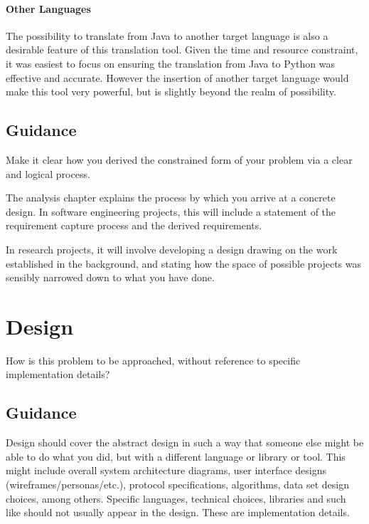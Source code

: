 \documentclass{l4proj}
\begin{document}
\subsubsection{Other Languages}
The possibility to translate from Java to another target language is also a desirable feature of this translation tool. Given the time and resource constraint, it was easiest to focus on ensuring the translation from Java to Python was effective and accurate. However the insertion of another target language would make this tool very powerful, but is slightly beyond the realm of possibility.




\section{Guidance}
Make it clear how you derived the constrained form of your problem via a clear and logical process. 

The analysis chapter explains the process by which you arrive at a concrete design. In software 
engineering projects, this will include a statement of the requirement capture process and the
derived requirements.

In research projects, it will involve developing a design drawing on
the work established in the background, and stating how the space of possible projects was
sensibly narrowed down to what you have done.

\chapter{Design}
How is this problem to be approached, without reference to specific implementation details? 
\section{Guidance}
Design should cover the abstract design in such a way that someone else might be able to do what you did, 
but with a different language or library or tool. This might include overall system architecture diagrams,
user interface designs (wireframes/personas/etc.), protocol specifications, algorithms, data set design choices,
among others. Specific languages, technical choices, libraries and such like should not usually appear in the design. These are implementation details.
\end{document}
